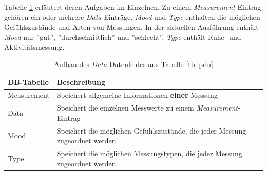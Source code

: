 Tabelle \ref{tbl:database-entities} erläutert deren Aufgaben im Einzelnen. Zu einem \textit{Measurement}-Eintrag gehören ein oder mehrere \textit{Data}-Einträge. \textit{Mood} und \textit{Type} enthalten die möglichen Gefühlszustände und Arten von Messungen. In der aktuellen Ausführung enthält \textit{Mood} nur ''gut'', ''durchschnittlich'' und ''schlecht''. \textit{Type} enthält Ruhe- und Aktivitätsmessung.  
\begin{table}[h]
	\centering
		\begin{tabularx}{\textwidth}{l|X}
			\hline
			DB-Tabelle & Beschreibung \\
			\hline
			\hline
			Measurement & Speichert allgemeine Informationen \textbf{einer} Messung\\
			\hline
			Data & Speichert die einzelnen Messwerte zu einem \textit{Measurement}-Eintrag\\
			\hline
			Mood & Speichert die möglichen Gefühlszustände, die jeder Messung zugeordnet werden\\
			\hline
			Type & Speichert die möglichen Messungstypen, die jeder Messung zugeordnet werden\\
			\hline
		\end{tabularx}
		\caption{Aufbau des \textit{Data}-Datenfeldes aus Tabelle \ref{tbl:pdu}}
		\label{tbl:database-entities}			
\end{table}

